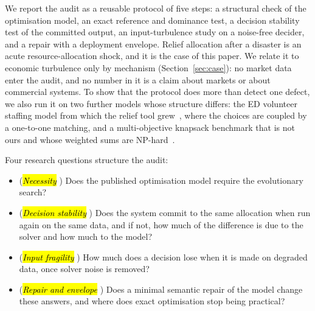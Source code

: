 \documentclass[systems,article,accept,moreauthors,pdftex]{Definitions/mdpi}
\begin{document}
We report the audit as a reusable protocol of five steps: a structural check of the
optimisation model, an exact reference and dominance test, a decision stability test of the
committed output, an input-turbulence study on a noise-free decider, and a repair with a
deployment envelope. Relief allocation after a disaster is an acute resource-allocation shock,
and it is the case of this paper. We relate it to economic turbulence only by mechanism
(Section~\ref{sec:case}): no market data enter the audit, and no number in it is a claim about
markets or about commercial systems. To show that the protocol does more than detect one
defect, we also run it on two further models whose structure differs: the ED volunteer staffing
model from which the relief tool grew~\cite{rabiei2023volunteer}, where the choices are coupled
by a one-to-one matching, and a multi-objective knapsack benchmark that is not ours and whose
weighted sums are NP-hard~\cite{zitzler1999spea}.

Four research questions structure the audit:
\begin{itemize}
\item[RQ1] (\emph{\hl{Necessity}%
}) Does the published optimisation model require the evolutionary
search?
\item[RQ2] (\emph{\hl{Decision stability}%
}) Does the system commit to the same allocation when run
again on the same data, and if not, how much of the difference is due to the solver and how
much to the model?
\item[RQ3] (\emph{\hl{Input fragility}%
}) How much does a decision lose when it is made on degraded
data, once solver noise is removed?
\item[RQ4] (\emph{\hl{Repair and envelope}%
}) Does a minimal semantic repair of the model change
these answers, and where does exact optimisation stop being practical?
\end{itemize}
\end{document}
